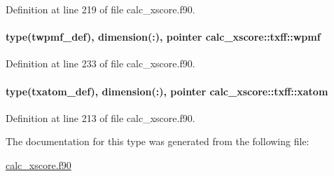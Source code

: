 Definition at line 219 of file calc\-\_\-xscore.\-f90.

\hypertarget{structcalc__xscore_1_1txff_ae90abf3cd88ed2be733ce7f0223df2e0}{
\paragraph[{wpmf}]{\setlength{\rightskip}{0pt plus 5cm}type({\bf twpmf\-\_\-def}), dimension(\-:), pointer calc\-\_\-xscore\-::txff\-::wpmf}}\label{structcalc__xscore_1_1txff_ae90abf3cd88ed2be733ce7f0223df2e0}


Definition at line 233 of file calc\-\_\-xscore.\-f90.

\hypertarget{structcalc__xscore_1_1txff_ae35d5e5460fce9bf72d477dff87a02d4}{
\paragraph[{xatom}]{\setlength{\rightskip}{0pt plus 5cm}type({\bf txatom\-\_\-def}), dimension(\-:), pointer calc\-\_\-xscore\-::txff\-::xatom}}\label{structcalc__xscore_1_1txff_ae35d5e5460fce9bf72d477dff87a02d4}


Definition at line 213 of file calc\-\_\-xscore.\-f90.



The documentation for this type was generated from the following file\-:\begin{DoxyCompactItemize}
\item 
\hyperlink{calc__xscore_8f90}{calc\-\_\-xscore.\-f90}\end{DoxyCompactItemize}
